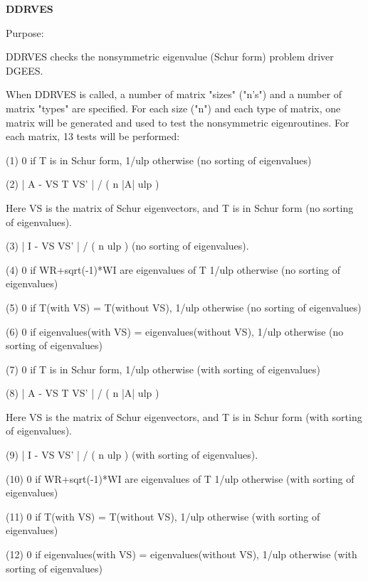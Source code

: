 {\bfseries D\+D\+R\+V\+E\+S} 

\begin{DoxyParagraph}{Purpose\+: }
\begin{DoxyVerb}    DDRVES checks the nonsymmetric eigenvalue (Schur form) problem
    driver DGEES.

    When DDRVES is called, a number of matrix "sizes" ("n's") and a
    number of matrix "types" are specified.  For each size ("n")
    and each type of matrix, one matrix will be generated and used
    to test the nonsymmetric eigenroutines.  For each matrix, 13
    tests will be performed:

    (1)     0 if T is in Schur form, 1/ulp otherwise
           (no sorting of eigenvalues)

    (2)     | A - VS T VS' | / ( n |A| ulp )

      Here VS is the matrix of Schur eigenvectors, and T is in Schur
      form  (no sorting of eigenvalues).

    (3)     | I - VS VS' | / ( n ulp ) (no sorting of eigenvalues).

    (4)     0     if WR+sqrt(-1)*WI are eigenvalues of T
            1/ulp otherwise
            (no sorting of eigenvalues)

    (5)     0     if T(with VS) = T(without VS),
            1/ulp otherwise
            (no sorting of eigenvalues)

    (6)     0     if eigenvalues(with VS) = eigenvalues(without VS),
            1/ulp otherwise
            (no sorting of eigenvalues)

    (7)     0 if T is in Schur form, 1/ulp otherwise
            (with sorting of eigenvalues)

    (8)     | A - VS T VS' | / ( n |A| ulp )

      Here VS is the matrix of Schur eigenvectors, and T is in Schur
      form  (with sorting of eigenvalues).

    (9)     | I - VS VS' | / ( n ulp ) (with sorting of eigenvalues).

    (10)    0     if WR+sqrt(-1)*WI are eigenvalues of T
            1/ulp otherwise
            (with sorting of eigenvalues)

    (11)    0     if T(with VS) = T(without VS),
            1/ulp otherwise
            (with sorting of eigenvalues)

    (12)    0     if eigenvalues(with VS) = eigenvalues(without VS),
            1/ulp otherwise
            (with sorting of eigenvalues)


\end{DoxyVerb}
\end{DoxyParagraph}
